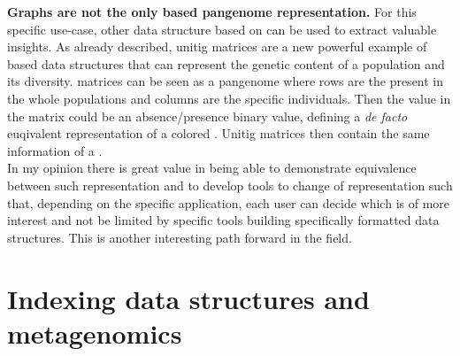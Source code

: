\textbf{Graphs are not the only \kmer based pangenome representation.}
For this specific use-case, other data structure based on \kmers can be used to extract valuable insights. 
As already described, unitig matrices are a new powerful example of \kmer based data structures that can represent the genetic content of a population and its diversity. 
\kmer matrices \cite{kmtricks} can be seen as a pangenome where rows are the \kmers present in the whole populations and columns are the specific individuals. Then the value in the matrix could be an absence/presence binary value, defining a \emph{de facto} euqivalent representation of a colored \dbg. Unitig matrices then contain the same information of a \ccdbg. \\
In my opinion there is great value in being able to demonstrate equivalence between such representation and to develop tools to change of representation such that, depending on the specific application, each user can decide which is of more interest and not be limited by specific tools building specifically formatted data structures. This is another interesting path forward in the field.


\section{Indexing data structures and metagenomics}